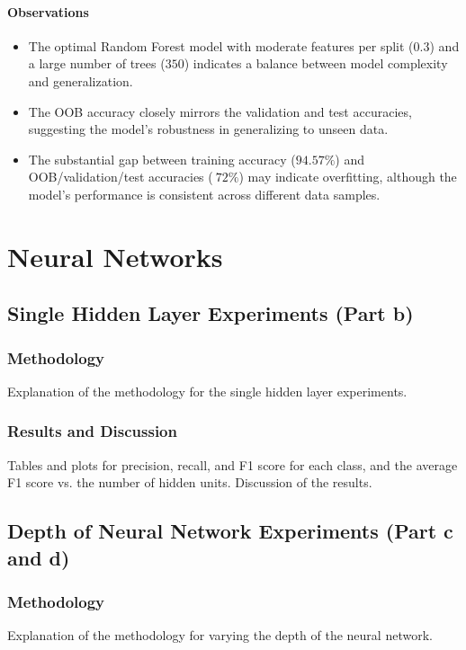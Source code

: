 \documentclass[12pt]{article}
\begin{document}
\paragraph{Observations}
\begin{itemize}
  \item The optimal Random Forest model with moderate features per split (\(0.3\)) and a large number of trees (\(350\)) indicates a balance between model complexity and generalization.
  \item The OOB accuracy closely mirrors the validation and test accuracies, suggesting the model's robustness in generalizing to unseen data.
  \item The substantial gap between training accuracy (\(94.57\%\)) and OOB/validation/test accuracies (\(~72\%\)) may indicate overfitting, although the model's performance is consistent across different data samples.
\end{itemize}


\section{Neural Networks}

\subsection{Single Hidden Layer Experiments (Part b)}
\subsubsection{Methodology}
Explanation of the methodology for the single hidden layer experiments.

\subsubsection{Results and Discussion}
Tables and plots for precision, recall, and F1 score for each class, and the average F1 score vs. the number of hidden units. Discussion of the results.

\subsection{Depth of Neural Network Experiments (Part c and d)}
\subsubsection{Methodology}
Explanation of the methodology for varying the depth of the neural network.
\end{document}
